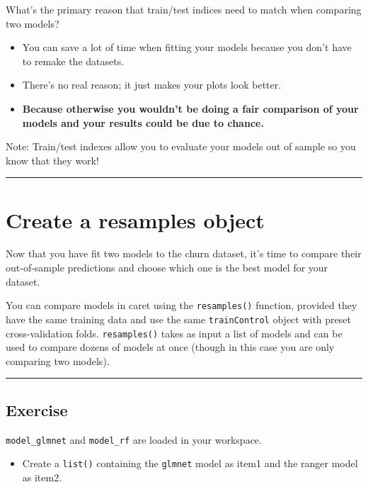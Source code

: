 \documentclass[
]{book}
\providecommand{\tightlist}{%
  \setlength{\itemsep}{0pt}\setlength{\parskip}{0pt}}
\begin{document}
What's the primary reason that train/test indices need to match when comparing two models?

\begin{itemize}
\item
  You can save a lot of time when fitting your models because you don't have to remake the datasets.
\item
  There's no real reason; it just makes your plots look better.
\item
  \textbf{Because otherwise you wouldn't be doing a fair comparison of your models and your results could be due to chance.}
\end{itemize}

Note: Train/test indexes allow you to evaluate your models out of sample so you know that they work!

\begin{center}\rule{0.5\linewidth}{0.5pt}\end{center}

\hypertarget{create-a-resamples-object}{%
\section{Create a resamples object}\label{create-a-resamples-object}}

Now that you have fit two models to the churn dataset, it's time to compare their out-of-sample predictions and choose which one is the best model for your dataset.

You can compare models in caret using the \texttt{resamples()} function, provided they have the same training data and use the same \texttt{trainControl} object with preset cross-validation folds. \texttt{resamples()} takes as input a list of models and can be used to compare dozens of models at once (though in this case you are only comparing two models).

\begin{center}\rule{0.5\linewidth}{0.5pt}\end{center}

\hypertarget{exercise-32}{%
\subsection*{Exercise}\label{exercise-32}}

\texttt{model\_glmnet} and \texttt{model\_rf} are loaded in your workspace.

\begin{itemize}
\tightlist
\item
  Create a \texttt{list()} containing the \texttt{glmnet} model as item1 and the ranger model as item2.
\end{itemize}
\end{document}
